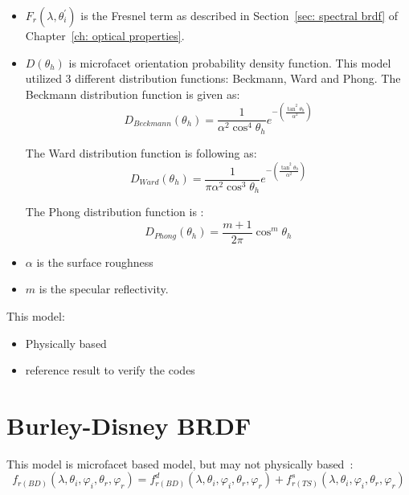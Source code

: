 \begin{itemize}
    \item $F_r(\lambda, \theta_i^\prime)$ is the Fresnel term as described in Section~\ref{sec: spectral brdf} of Chapter~\ref{ch: optical properties}.

    \item $D(\theta_h)$ is microfacet orientation probability density function.
          This model utilized 3 different distribution functions: Beckmann, Ward and Phong.
          The Beckmann distribution function is given as:
          \begin{equation}
              \label{eq_beckmann_kelemen}
              D_{Beckmann}(\theta_h) = \frac{1}{\alpha^2 \cos^4 \theta_h} e^{- \left(\frac{\tan^2\theta_h}{\alpha^2}\right)}
          \end{equation}

          The Ward distribution function is following as:
          \begin{equation}
              \label{eq_Ward}
              D_{Ward}(\theta_h) = \frac{1}{\pi \alpha^2 \cos^3 \theta_h} e^{- \left(\frac{\tan^2\theta_h}{\alpha^2}\right)}
          \end{equation}

          The Phong distribution function is :
          \begin{equation}
              \label{eq_Phong}
              D_{Phong}(\theta_h) = \frac{m+1}{2 \pi} \cos^m\theta_h
          \end{equation}

    \item $\alpha$ is the surface roughness

    \item $m$ is the specular reflectivity.

\end{itemize}

This model:
\begin{itemize}
    \item Physically based
    \item reference result to verify the codes
\end{itemize}

\section{Burley-Disney BRDF}
This model is microfacet based model, but may not physically based~\cite{2012_Burley}:
\begin{equation}
    \label{eq_Burley-Disney}
    f_{r(BD)}(\lambda, \theta_i, \varphi_i, \theta_r, \varphi_r) = f_{r(BD)}^{d}(\lambda, \theta_i, \varphi_i, \theta_r, \varphi_r) + f_{r(TS)}^{s}(\lambda, \theta_i, \varphi_i, \theta_r, \varphi_r)
\end{equation}


